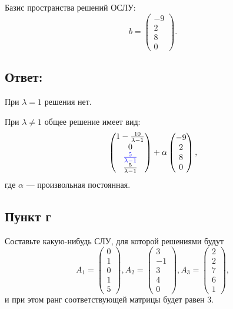 \documentclass[12pt]{article}
\begin{document}
    Базис пространства решений ОСЛУ:
    \[
        b =
        \begin{pmatrix}
            - 9 \\ 2 \\ 8 \\ 0
        \end{pmatrix}
        .
    \]

    \subsection*{Ответ:}
    При $\lambda = 1$ решения нет.

    При $\lambda \neq 1$ общее решение имеет вид:
    \[
        \begin{pmatrix}
            1 - \frac{10}{\lambda - 1}              \\
            0                                       \\
            \textcolor{blue}{\frac{5}{\lambda - 1}} \\
            \frac{5}{\lambda - 1}
        \end{pmatrix}
        + \alpha
        \begin{pmatrix}
            - 9 \\ 2 \\ 8 \\ 0
        \end{pmatrix}
        ,
    \]
    где $\alpha$ --- произвольная постоянная.

    \subsection*{Пункт г}
    Составьте какую-нибудь СЛУ, для которой решениями будут
    \[
        A_1 =
        \begin{pmatrix}
            0 \\ 1 \\ 0 \\ 1 \\ 5
        \end{pmatrix},
        A_2 =
        \begin{pmatrix}
            3 \\ -1 \\ 3 \\ 4 \\ 0
        \end{pmatrix},
        A_3 =
        \begin{pmatrix}
            2 \\ 2 \\ 7 \\ 6 \\ 1
        \end{pmatrix},
    \]
    и при этом ранг соответствующей матрицы будет равен 3.
\end{document}
